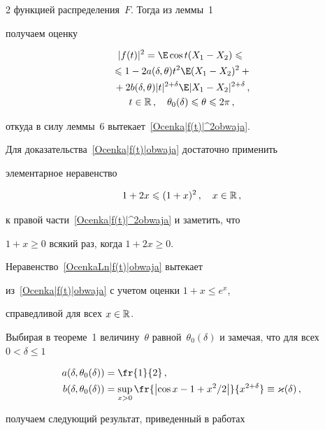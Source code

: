 \begin{multicols}{2}
функцией распределения~$F$. Тогда из леммы~1

получаем оценку

\begin{multline*}

|f(t)|^2=\E \cos t(X_1-X_2)\le{}

\\

{}\le 1-2a(\d,\theta)t^2\E(X_1-X_2)^2+{}\\

{}+ 2b(\d,\theta)|t|^{2+\d}\E

|X_1-X_2|^{2+\d}\,,\\

t\in\R\,,\quad \theta_0(\d)\le\theta\le2\pi\,,

\end{multline*}

откуда в силу леммы~6 вытекает~\eqref{Ocenka|f(t)|^2obwaja}.



Для доказательства~\eqref{Ocenka|f(t)|obwaja} достаточно применить

элементарное неравенство

$$

1+2x\le(1+x)^2\,,\quad x\in\R\,,

$$

к правой части~\eqref{Ocenka|f(t)|^2obwaja} и заметить, что

$1+x\ge0$ всякий раз, когда $1+2x\ge0$.



Неравенство~\eqref{OcenkaLn|f(t)|obwaja} вытекает

из~\eqref{Ocenka|f(t)|obwaja} с учетом оценки ${1+x\le e^x}$,

справедливой для всех $x\in\mathbb R$.

\medskip



Выбирая в теореме~1 величину~$\theta$ равной~$\theta_0(\delta)$ и замечая, что для всех $0<\delta\le1$

\begin{align*}

a(\delta,\theta_0(\delta))&=\fr{1}{2}\,,\\

b(\d,\theta_0(\d))&=\sup_{x>0}\fr{\left|\cos

x-1+x^2/2\right|}{x^{2+\d}}\equiv\varkappa(\d)\,,

\end{align*}

получаем следующий результат, приведенный в работах


\end{multicols}
